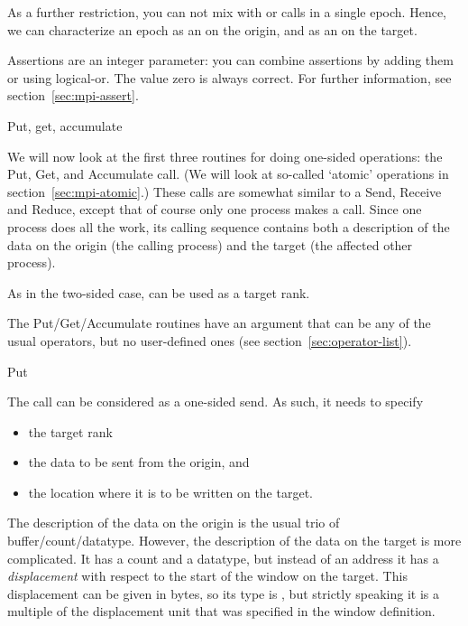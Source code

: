 As a further restriction, you can not mix  with 
or  calls in a single epoch. Hence, we can
characterize an epoch as an  on the
origin, and as an  on the target.

Assertions are an integer parameter: you can combine assertions by
adding them or using logical-or.
The value zero is always correct. For further information, see
section~\ref{sec:mpi-assert}.


 {Put, get, accumulate}
\label{sec:putget}

We will now look at the first three routines for doing one-sided
operations: the Put, Get, and Accumulate call. (We will look at
so-called `atomic' operations in section~\ref{sec:mpi-atomic}.)
These calls are somewhat
similar to a Send, Receive and Reduce, except that of course only one
process makes a call.
Since one process does all the work, its calling sequence contains
both a description of the data on the origin (the calling process) and
the target (the affected other process).

As in the two-sided case,  can be used as
a target rank.

The Put/Get/Accumulate routines have an 
argument that can be any of the usual operators, but no
user-defined ones (see section~\ref{sec:operator-list}).

 {Put}
\label{sec:mpi-put}

The  call can be considered as a one-sided
send. As such, it needs to specify
\begin{itemize}
\item the target rank
\item the data to be sent from the origin, and
\item the location where it is to be written on the target.
\end{itemize}

The description of the data on the origin is the usual trio of
buffer/count/datatype. However, the description of the data on the
target is more complicated. It has a count and a datatype, but instead
of an address it has a
\emph{displacement} with respect to the
start of the window on the target. This displacement can be given in
bytes, so its type is , but strictly speaking
it is a multiple of the displacement unit that was specified in the
window definition.

